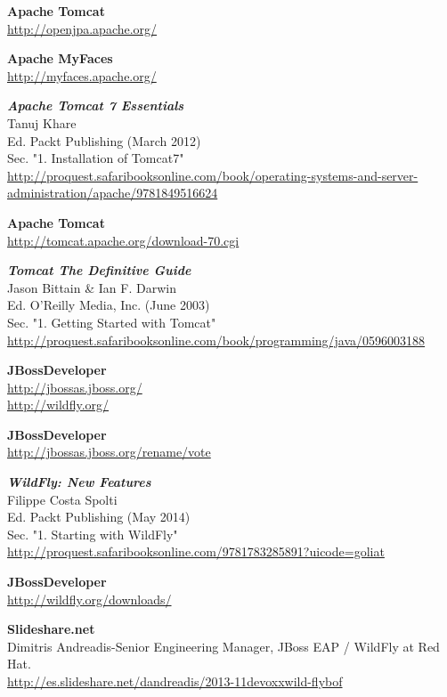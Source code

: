 \documentclass[a4paper, 10pt]{article}
\begin{document}
\begin{thebibliography}{10}
	\textbf{Apache Tomcat}\\
		\url{http://openjpa.apache.org/}

	\textbf{Apache MyFaces}\\
		\url{http://myfaces.apache.org/}

	\textbf{\textit{Apache Tomcat 7 Essentials}}\\
	Tanuj Khare\\
	Ed. Packt Publishing (March 2012)\\
	Sec. "1. Installation of Tomcat7"\\
		\url{http://proquest.safaribooksonline.com/book/operating-systems-and-server-administration/apache/9781849516624}
	
	\textbf{Apache Tomcat}\\
		\url{http://tomcat.apache.org/download-70.cgi}

	\textbf{\textit{Tomcat The Definitive Guide}}\\
	Jason Bittain \& Ian F. Darwin\\
	Ed. O'Reilly Media, Inc. (June 2003)\\
	Sec. "1. Getting Started with Tomcat"\\
		\url{http://proquest.safaribooksonline.com/book/programming/java/0596003188}
	
	\textbf{JBossDeveloper}\\
		\url{http://jbossas.jboss.org/}\\
		\url{http://wildfly.org/}
	
	\textbf{JBossDeveloper}\\
		\url{http://jbossas.jboss.org/rename/vote}
	
	\textbf{\textit{WildFly: New Features}}\\
	Filippe Costa Spolti\\
	Ed. Packt Publishing (May 2014)\\
	Sec. "1. Starting with WildFly"\\
		\url{http://proquest.safaribooksonline.com/9781783285891?uicode=goliat} 

	\textbf{JBossDeveloper}\\
		\url{http://wildfly.org/downloads/}
	
	\textbf{Slideshare.net}\\
	Dimitris Andreadis-Senior Engineering Manager, JBoss EAP / WildFly at Red Hat.\\
		\url{http://es.slideshare.net/dandreadis/2013-11devoxxwild-flybof}
	

\end{thebibliography}
\end{document}

